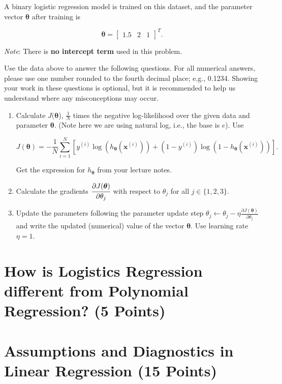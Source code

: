 \documentclass[12pt, xcolor=dvipsnames,svgnames,x11names]{article}
\begin{document}
A binary logistic regression model is trained on this dataset, and the parameter vector $\boldsymbol{\theta}$ after training is

$$\boldsymbol{\theta} = \begin{bmatrix}1.5 & 2 & 1\end{bmatrix}^T.$$

\textit{Note}: There is \textbf{no intercept term} used in this problem.

Use the data above to answer the following questions. For all numerical answers, please use one number rounded to the fourth decimal place; e.g., 0.1234. Showing your work in these questions is optional, but it is recommended to help us understand where any misconceptions may occur.

\begin{enumerate}
    \item  Calculate  $J(\boldsymbol{\theta}$), $\frac{1}{N}$ times the negative log-likelihood over the given data and parameter $\boldsymbol{\theta}$. (Note here we are using natural log, i.e., the base is $e$). Use 
    
$$
J(\boldsymbol{\theta}) = -\frac{1}{N} \sum_{i=1}^N \left[ y^{(i)} \log(h_{\boldsymbol{\theta}}(\mathbf{x}^{(i)})) + (1 - y^{(i)}) \log(1 - h_{\boldsymbol{\theta}}(\mathbf{x}^{(i)})) \right].
$$
    
    Get the expression for $h_{\boldsymbol{\theta}}$ from your lecture notes.

    \item Calculate the gradients $\cfrac{\partial J(\boldsymbol{\theta})}{\partial \theta_j}$ with respect to $\theta_{j}$ for all $j \in \{1, 2, 3\}$.

    \item Update the parameters following the parameter update step $\theta_j \leftarrow \theta_j - \eta \frac{\partial J(\boldsymbol{\theta})}{\partial \theta_j}$ and write the updated (numerical) value of the vector $\boldsymbol{\theta}$. Use learning rate $\eta = 1$.
\end{enumerate}

\section{How is Logistics Regression different from Polynomial Regression? (5 Points)}

\section{Assumptions and Diagnostics in Linear Regression (15 Points)}
\end{document}
